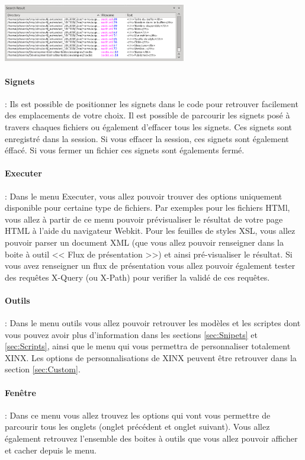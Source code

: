 \documentclass[a4paper,10pt,twoside]{book}
\begin{document}
\begin{center}
 \includegraphics[width=0.60\textwidth]{./xinxsearchresult.png}
\end{center}

\paragraph{Signets} : Ils est possible de positionner les signets dans le code pour retrouver facilement des emplacements de votre choix. Il est possible de parcourir les signets posé à travers chaques fichiers ou également d'effacer tous les signets. Ces signets sont enregistré dans la session. Si vous effacer la session, ces signets sont également éffacé. Si vous fermer un fichier ces signets sont égalements fermé.

\paragraph{Executer} : Dans le menu Executer, vous allez pouvoir trouver des options uniquement disponible pour certaine type de fichiers. Par exemples pour les fichiers HTMl, vous allez à partir de ce menu pouvoir prévisualiser le résultat de votre page HTML à l'aide du navigateur Webkit. Pour les feuilles de styles XSL, vous allez pouvoir parser un document XML (que vous allez pouvoir renseigner dans la boite à outil << Flux de présentation >>) et ainsi pré-visualiser le résultat. Si vous avez renseigner un flux de présentation vous allez pouvoir également tester des requêtes X-Query (ou X-Path) pour verifier la validé de ces requêtes.

\paragraph{Outils} : Dans le menu outils vous allez pouvoir retrouver les modèles et les scriptes dont vous pouvez avoir plus d'information dans les sections \ref{sec:Snipets} et \ref{sec:Scripts}, ainsi que le menu qui vous permettra de personnaliser totalement XINX. Les options de personnalisations de XINX peuvent être retrouver dans la section \ref{sec:Custom}.

\paragraph{Fenêtre} : Dans ce menu vous allez trouvez les options qui vont vous permettre de parcourir tous les onglets (onglet précédent et onglet suivant). Vous allez également retrouvez l'ensemble des boites à outils que vous allez pouvoir afficher et cacher depuis le menu.
\end{document}
